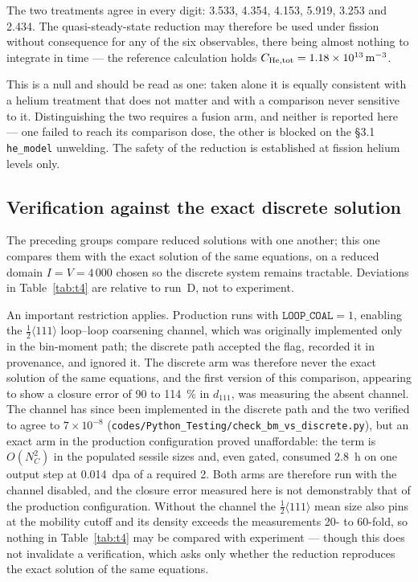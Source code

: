 \documentclass[11pt]{article}
\newcommand{\halfp}{$\tfrac{1}{2}\langle111\rangle$}
\begin{document}
The two treatments agree in every digit: 3.533, 4.354, 4.153, 5.919, 3.253 and
2.434. The quasi-steady-state reduction may therefore be used under fission
without consequence for any of the six observables, there being almost nothing
to integrate in time --- the reference calculation holds
$C_{\rm He,tot} = \SI{1.18e13}{\per\meter\cubed}$.

This is a null and should be read as one: taken alone it is equally consistent
with a helium treatment that does not matter and with a comparison never
sensitive to it. Distinguishing the two requires a fusion arm, and neither is
reported here --- one failed to reach its comparison dose, the other is blocked
on the \S3.1 \texttt{he\_model} unwelding. The safety of the reduction is
established at fission helium levels only.

\FloatBarrier
\subsection{Verification against the exact discrete solution}\label{sec:t4}

The preceding groups compare reduced solutions with one another; this one
compares them with the exact solution of the same equations, on a reduced domain
$I = V = 4\,000$ chosen so the discrete system remains tractable. Deviations in
Table~\ref{tab:t4} are relative to run~D, not to experiment.

An important restriction applies. Production runs with
$\texttt{LOOP\_COAL} = 1$, enabling the \halfp{} loop--loop coarsening channel,
which was originally implemented only in the bin-moment path; the discrete path
accepted the flag, recorded it in provenance, and ignored it. The discrete arm
was therefore never the exact solution of the same equations, and the first
version of this comparison, appearing to show a closure error of 90 to
\SI{114}{\percent} in $d_{111}$, was measuring the absent channel. The channel
has since been implemented in the discrete path and the two verified to agree to
$7 \times 10^{-8}$
(\texttt{codes/Python\_Testing/check\_bm\_vs\_discrete.py}), but an exact arm in
the production configuration proved unaffordable: the term is $O(N_C^2)$ in the
populated sessile sizes and, even gated, consumed \SI{2.8}{\hour} on one output
step at \SI{0.014}{dpa} of a required 2. Both arms are therefore run with the
channel disabled, and the closure error measured here is not demonstrably that
of the production configuration. Without the channel the \halfp{} mean size also
pins at the mobility cutoff and its density exceeds the measurements 20- to
60-fold, so nothing in Table~\ref{tab:t4} may be compared with experiment ---
though this does not invalidate a verification, which asks only whether the
reduction reproduces the exact solution of the same equations.
\end{document}

